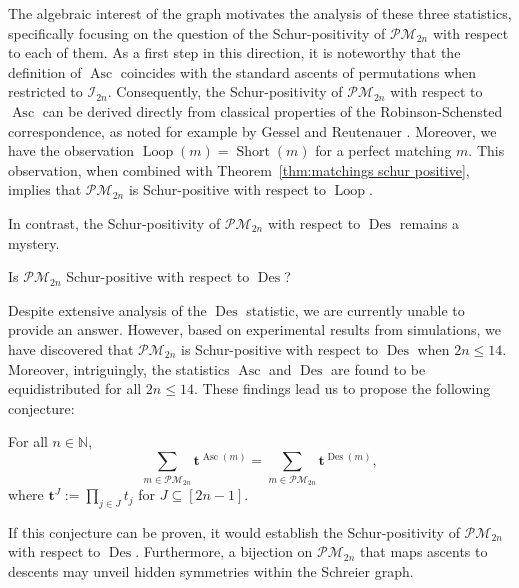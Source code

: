 \documentclass[ALCO]{cedram}
\newcommand{\Des}{\operatorname{Des}}
\newcommand{\Asc}{\operatorname{Asc}}
\newcommand{\Short}{\operatorname{Short}}
\newcommand{\Loop}{\operatorname{Loop}}
\newcommand{\NN}{\mathbb{N}}
\newcommand{\I}{\mathcal{I}}
\newcommand{\PM}{\mathcal{PM}}
\begin{document}
The algebraic interest of the graph motivates the analysis of these three statistics, specifically focusing on the question of the Schur-positivity of $\PM_{2n}$ with respect to each of them. As a first step in this direction, it is noteworthy that the definition of $\Asc$ coincides with the standard ascents of permutations when restricted to $\I_{2n}$. Consequently, the Schur-positivity of $\PM_{2n}$ with respect to $\Asc$ can be derived directly from classical properties of the Robinson-Schensted correspondence, as noted for example by Gessel and Reutenauer \cite[end of Section 7]{gessel1993counting}.
Moreover, we have the observation $\Loop(m) = \Short(m)$ for a perfect matching $m$. This observation, when combined with Theorem~\ref{thm:matchings schur positive}, implies that $\PM_{2n}$ is Schur-positive with respect to $\Loop$.

In contrast, the Schur-positivity of $\PM_{2n}$ with respect to $\Des$ remains a mystery.

\begin{question}
    Is $\PM_{2n}$ Schur-positive with respect to $\Des$?
\end{question}

Despite extensive analysis of the $\Des$ statistic, we are currently unable to provide an answer. However, based on experimental results from simulations, we have discovered that $\PM_{2n}$ is Schur-positive with respect to $\Des$ when $2n \leq 14$. Moreover, intriguingly, the statistics $\Asc$ and $\Des$ are found to be equidistributed for all $2n \leq 14$. These findings lead us to propose the following conjecture:

\begin{conjecture}
    For all $n \in \NN$,
    \[
        \sum_{m \in \PM_{2n}} \boldsymbol{t}^{\Asc(m)} = \sum_{m \in \PM_{2n}} \boldsymbol{t}^{\Des(m)},
    \]
    where $\boldsymbol{t}^J := \prod_{j \in J} t_j$ for $J \subseteq [2n-1]$.
\end{conjecture}

If this conjecture can be proven, it would establish the Schur-positivity of $\PM_{2n}$ with respect to $\Des$. Furthermore, a bijection on $\PM_{2n}$ that maps ascents to descents may unveil hidden symmetries within the Schreier graph.






\end{document}
